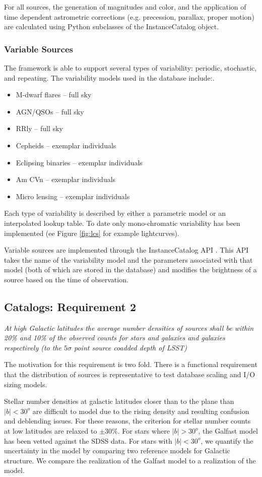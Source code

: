 \documentclass[]{article}
\begin{document}
{For all sources, the generation of magnitudes and color, and the
application of time dependent astrometric corrections (e.g.
precession, parallax, proper motion) are calculated using Python
subclasses of the InstanceCatalog object.

\subsubsection{Variable Sources}
The framework is able to support several types of variability:
periodic, stochastic, and repeating.
The variability models used in the database include:.  
\begin{itemize}
\item M-dwarf flares -- full sky
\item AGN/QSOs -- full sky
\item RRly -- full sky
\item Cepheids -- exemplar individuals
\item Eclipsing binaries -- exemplar individuals
\item Am CVn -- exemplar individuals
\item Micro lensing -- exemplar individuals
\end{itemize}
Each type of variability is described by either a parametric model or
an interpolated lookup table.  To date only mono-chromatic variability
has been implemented (ee Figure \ref{fig:lcs} for example lightcurves).

Variable sources are implemented through the InstanceCatalog API
\citep{XXX}. This API takes the name of the variability model and the
parameters associated with that model (both of which are stored in the
database) and modifies the brightness of a source based on the time of
observation.

\subsection{Catalogs: Requirement 2}

{\it At high Galactic latitudes the average number densities of
  sources shall be within 20\% and 10\% of the observed counts for
  stars and galaxies and galaxies respectively (to the $5\sigma$ point
  source coadded depth of LSST)} 

The motivation for this requirement is two fold.  There is a
functional requirement that the distribution of sources is
representative to test database scaling and I/O sizing models.

Stellar number densities at galactic latitudes closer than to the plane than $|b| < 30^o$ are difficult to model due to the rising density and resulting confusion and deblending issues.
For these reasons, the criterion for stellar number counts at low latitudes are relaxed to $\pm 30\%$. 
For stars where $|b| > 30^o$, the Galfast model has been vetted against the SDSS data.  For stars with $|b| < 30^o$, we quantify the uncertainty in the model by comparing two reference models for Galactic structure.
We compare the realization of the Galfast model to a realization of the \citet{besancon} model.

}
\end{document}
